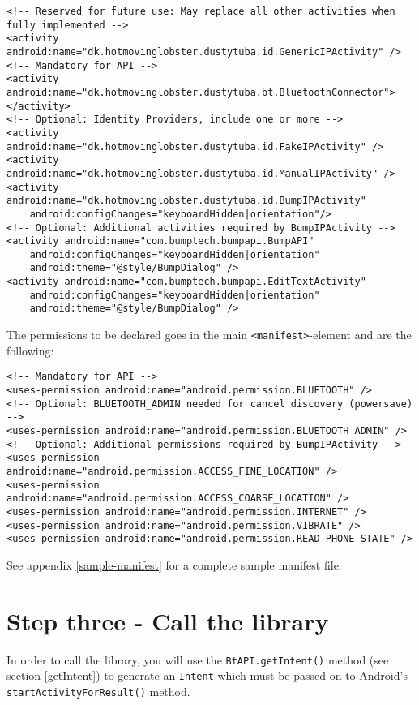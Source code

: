 \documentclass[a4paper,11pt]{article}
\begin{document}
\footnotesize
\begin{verbatim}
<!-- Reserved for future use: May replace all other activities when fully implemented -->
<activity android:name="dk.hotmovinglobster.dustytuba.id.GenericIPActivity" />
<!-- Mandatory for API -->
<activity android:name="dk.hotmovinglobster.dustytuba.bt.BluetoothConnector"></activity>
<!-- Optional: Identity Providers, include one or more -->
<activity android:name="dk.hotmovinglobster.dustytuba.id.FakeIPActivity" />
<activity android:name="dk.hotmovinglobster.dustytuba.id.ManualIPActivity" />
<activity android:name="dk.hotmovinglobster.dustytuba.id.BumpIPActivity"
    android:configChanges="keyboardHidden|orientation"/>
<!-- Optional: Additional activities required by BumpIPActivity -->
<activity android:name="com.bumptech.bumpapi.BumpAPI"
    android:configChanges="keyboardHidden|orientation"
    android:theme="@style/BumpDialog" />
<activity android:name="com.bumptech.bumpapi.EditTextActivity"
    android:configChanges="keyboardHidden|orientation"
    android:theme="@style/BumpDialog" />
\end{verbatim}
\normalsize

The permissions to be declared goes in the main \verb+<manifest>+-element and are the following:

\footnotesize
\begin{verbatim}
<!-- Mandatory for API -->
<uses-permission android:name="android.permission.BLUETOOTH" />
<!-- Optional: BLUETOOTH_ADMIN needed for cancel discovery (powersave) -->
<uses-permission android:name="android.permission.BLUETOOTH_ADMIN" />
<!-- Optional: Additional permissions required by BumpIPActivity -->
<uses-permission android:name="android.permission.ACCESS_FINE_LOCATION" />
<uses-permission android:name="android.permission.ACCESS_COARSE_LOCATION" />
<uses-permission android:name="android.permission.INTERNET" />
<uses-permission android:name="android.permission.VIBRATE" />
<uses-permission android:name="android.permission.READ_PHONE_STATE" />
\end{verbatim}
\normalsize

See appendix \ref{sample-manifest} for a complete sample manifest file.

\clearpage


\section{Step three - Call the library}
\label{stepthree}
In order to call the library, you will use the \verb+BtAPI.getIntent()+ method (see section \ref{getIntent}) to generate an \verb+Intent+ which must be passed on to Android's \verb+startActivityForResult()+ method.
\end{document}
